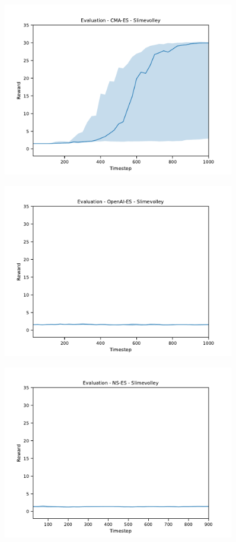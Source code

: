 \begin{figure}[H]
    \includegraphics[width=0.9\textwidth]{img/eval-slime-cmaes.pdf}
\end{figure}
\begin{figure}[H]
    \includegraphics[width=0.9\textwidth]{img/eval-slime-open.pdf}
\end{figure}
\begin{figure}[H]
    \includegraphics[width=0.9\textwidth]{img/eval-slime-nses.pdf}
\end{figure}
